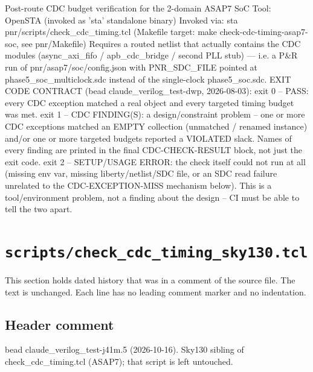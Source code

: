 \begin{record}
\begin{textblock}
Post-route CDC budget verification for the 2-domain ASAP7 SoC
Tool: OpenSTA (invoked as 'sta' standalone binary)
Invoked via: sta pnr/scripts/check_cdc_timing.tcl
(Makefile target: make check-cdc-timing-asap7-soc, see pnr/Makefile)
Requires a routed netlist that actually contains the CDC modules
(async_axi_fifo / apb_cdc_bridge / second PLL stub) — i.e. a P&R run of
pnr/asap7/soc/config.json with PNR_SDC_FILE pointed at
phase5_soc_multiclock.sdc instead of the single-clock phase5_soc.sdc.
EXIT CODE CONTRACT (bead claude_verilog_test-dwp, 2026-08-03):
  exit 0 -- PASS: every CDC exception matched a real object and every
            targeted timing budget was met.
  exit 1 -- CDC FINDING(S): a design/constraint problem -- one or more
            CDC exceptions matched an EMPTY collection (unmatched /
            renamed instance) and/or one or more targeted budgets
            reported a VIOLATED slack. Names of every finding are
            printed in the final CDC-CHECK-RESULT block, not just the
            exit code.
  exit 2 -- SETUP/USAGE ERROR: the check itself could not run at all
            (missing env var, missing liberty/netlist/SDC file, or an
            SDC read failure unrelated to the CDC-EXCEPTION-MISS
            mechanism below). This is a tool/environment problem, not a
            finding about the design -- CI must be able to tell the two
            apart.
\end{textblock}

\end{record}

\section{\texttt{scripts/check\_cdc\_timing\_sky130.tcl}}\label{cr:pd:scripts-check-cdc-timing-sky130-tcl}

This section holds dated history that was in a comment of the source file. The text is unchanged. Each line has no leading comment marker and no indentation.

\begin{record}

\subsection*{Header comment}

\begin{textblock}
bead claude_verilog_test-j41m.5 (2026-10-16). Sky130 sibling of check_cdc_timing.tcl
(ASAP7); that script is left untouched.

\end{textblock}

\end{record}

